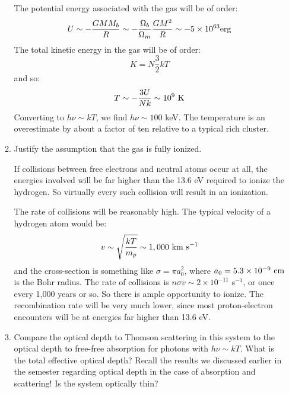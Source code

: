 \documentclass[11pt, preprint]{article}
\begin{document}
\begin{enumerate}
\begin{enumerate}
    \begin{answer}
      The potential energy associated with the gas will be of order:
      \begin{equation}
        U \sim - \frac{G M M_b}{R} \sim 
        - \frac{\Omega_b}{\Omega_m} \frac{G M^2}{R} \sim - 5\times 10^{63}
             {\rm erg}
      \end{equation}
      The total kinetic energy in the gas will be of order:
      \begin{equation}
        K = N \frac{3}{2} k T 
      \end{equation}
      and so:
      \begin{equation}
        T \sim -\frac{3 U}{N k} \sim 10^{9} {\rm ~K}
      \end{equation}
      Converting to $h\nu \sim kT$, we find $h\nu\sim 100$ keV. 
      The temperature is an overestimate by about a factor of ten
      relative to a typical rich cluster. 
    \end{answer}
  \item Justify the assumption that the gas is fully ionized.

    \begin{answer}
      If collisions between free electrons and neutral atoms occur at
      all, the energies involved will be far higher than the 13.6 eV
      required to ionize the hydrogen. So virtually every such
      collision will result in an ionization.

      The rate of collisions will be reasonably high. The typical
      velocity of a hydrogen atom would be:
      \begin{equation}
        v \sim \sqrt{\frac{kT}{m_p}} \sim 1,000 {\rm ~km} {\rm
          ~s}^{-1}
      \end{equation}
      and the cross-section is something like $\sigma = \pi a_0^2$,
      where $a_0 = 5.3\times 10^{-9} {\rm ~cm}$ is the Bohr radius.
      The rate of collisions is $n \sigma v \sim 2 \times 10^{-11}$
      s$^{-1}$, or once every 1,000 years or so. So there is ample
      opportunity to ionize. The recombination rate will be very much
      lower, since most proton-electron encounters will be at energies
      far higher than 13.6 eV.
    \end{answer}
  \item Compare the optical depth to Thomson scattering in this system
    to the optical depth to free-free absorption for photons with
    $h\nu \sim kT$. What is the total effective optical depth? Recall
    the results we discussed earlier in the semester regarding optical
    depth in the case of absorption and scattering! Is the system
    optically thin?


\end{enumerate}
\end{enumerate}
\end{document}
